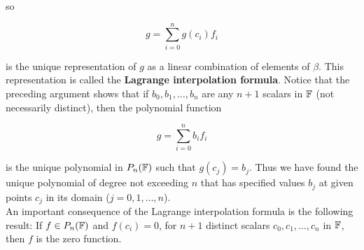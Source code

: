 \begin{definition}
	so
	
	\[g=\sum_{i=0}^{n}g(c_i)f_i\]
	
	is the unique representation of $g$ as a linear combination of elements of $\beta$. This representation is called the \textbf{Lagrange interpolation formula}. Notice that the preceding argument shows that if $b_0, b_1, \dots, b_n$ are any $n+1$ scalars in $\mathbb{F}$ (not necessarily distinct), then the polynomial function
	
	\[g = \sum_{i=0}^{n}b_if_i\]
	
	is the unique polynomial in $P_n(\mathbb{F})$ such that $g(c_j) = b_j$. Thus we have found the unique polynomial of degree not exceeding $n$ that has specified values $b_j$ at given points $c_j$ in its domain ($j = 0, 1, \dots, n$).\\
	
	An important consequence of the Lagrange interpolation formula is the following result: If $f \in P_n(\mathbb{F})$ and $f(c_i) = 0$, for $n+1$ distinct scalars $c_0, c_1, \dots, c_n$ in $\mathbb{F}$, then $f$ is the zero function.
\end{definition}